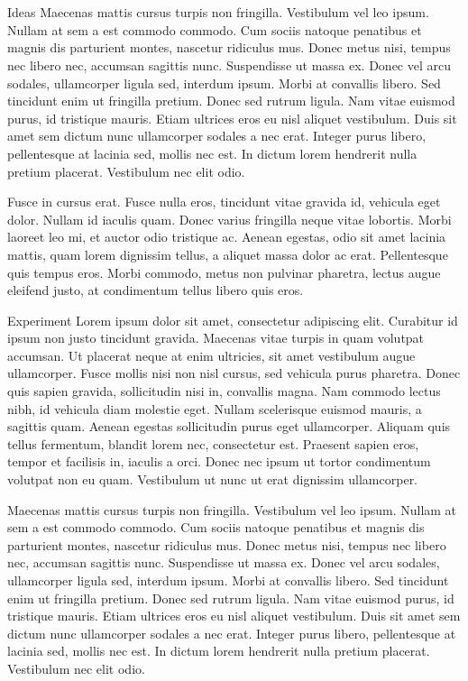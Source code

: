 \documentclass[12pt]{beamer}
\renewcommand{\maketitle}{%
	\begin{center}%
		\Huge\inserttitle\\[7mm]%
		\Large\insertauthor\\[5mm]%
		\Large\insertinstitute%
	\end{center}%
	\vspace*{-2ex}%
}
\begin{document}
\begin{frame}{\maketitle}
\begin{columns}
\begin{column}{.45\textwidth}
\begin{block}{Ideas}
					Maecenas mattis cursus turpis non fringilla. Vestibulum vel leo ipsum. Nullam at sem a est commodo commodo. Cum sociis natoque penatibus et magnis dis parturient montes, nascetur ridiculus mus. Donec metus nisi, tempus nec libero nec, accumsan sagittis nunc. Suspendisse ut massa ex. Donec vel arcu sodales, ullamcorper ligula sed, interdum ipsum. Morbi at convallis libero. Sed tincidunt enim ut fringilla pretium. Donec sed rutrum ligula. Nam vitae euismod purus, id tristique mauris. Etiam ultrices eros eu nisl aliquet vestibulum. Duis sit amet sem dictum nunc ullamcorper sodales a nec erat. Integer purus libero, pellentesque at lacinia sed, mollis nec est. In dictum lorem hendrerit nulla pretium placerat. Vestibulum nec elit odio.

					Fusce in cursus erat. Fusce nulla eros, tincidunt vitae gravida id, vehicula eget dolor. Nullam id iaculis quam. Donec varius fringilla neque vitae lobortis. Morbi laoreet leo mi, et auctor odio tristique ac. Aenean egestas, odio sit amet lacinia mattis, quam lorem dignissim tellus, a aliquet massa dolor ac erat. Pellentesque quis tempus eros. Morbi commodo, metus non pulvinar pharetra, lectus augue eleifend justo, at condimentum tellus libero quis eros.
				\end{block}
				\vspace{1em}
				\begin{block}{Experiment}
					Lorem ipsum dolor sit amet, consectetur adipiscing elit. Curabitur id ipsum non justo tincidunt gravida. Maecenas vitae turpis in quam volutpat accumsan. Ut placerat neque at enim ultricies, sit amet vestibulum augue ullamcorper. Fusce mollis nisi non nisl cursus, sed vehicula purus pharetra. Donec quis sapien gravida, sollicitudin nisi in, convallis magna. Nam commodo lectus nibh, id vehicula diam molestie eget. Nullam scelerisque euismod mauris, a sagittis quam. Aenean egestas sollicitudin purus eget ullamcorper. Aliquam quis tellus fermentum, blandit lorem nec, consectetur est. Praesent sapien eros, tempor et facilisis in, iaculis a orci. Donec nec ipsum ut tortor condimentum volutpat non eu quam. Vestibulum ut nunc ut erat dignissim ullamcorper.

					Maecenas mattis cursus turpis non fringilla. Vestibulum vel leo ipsum. Nullam at sem a est commodo commodo. Cum sociis natoque penatibus et magnis dis parturient montes, nascetur ridiculus mus. Donec metus nisi, tempus nec libero nec, accumsan sagittis nunc. Suspendisse ut massa ex. Donec vel arcu sodales, ullamcorper ligula sed, interdum ipsum. Morbi at convallis libero. Sed tincidunt enim ut fringilla pretium. Donec sed rutrum ligula. Nam vitae euismod purus, id tristique mauris. Etiam ultrices eros eu nisl aliquet vestibulum. Duis sit amet sem dictum nunc ullamcorper sodales a nec erat. Integer purus libero, pellentesque at lacinia sed, mollis nec est. In dictum lorem hendrerit nulla pretium placerat. Vestibulum nec elit odio.


\end{block}
\end{column}
\end{columns}
\end{frame}
\end{document}
